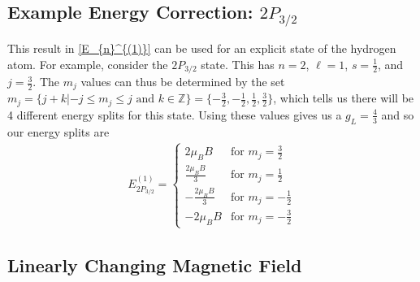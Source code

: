 \subsection{Example Energy Correction: $2P_{3/2}$}

This result in \ref{E_{n}^{(1)}} can be used for an explicit state of the hydrogen atom. For example, consider the $2P_{3/2}$ state. This has $n=2$, $\ell =1$, $s=\frac{1}{2}$, and $j=\frac{3}{2}$. The $m_j$ values can thus be determined by the set $m_j = \{j+k|-j \leq m_j \leq j \textrm{ and } k \in \mathbb{Z}\} = \{-\frac{3}{2},-\frac{1}{2}, \frac{1}{2}, \frac{3}{2} \}$, which tells us there will be 4 different energy splits for this state. Using these values gives us a $g_L=\frac{4}{3}$ and so our energy splits are
\begin{align}
	E_{2P_{3/2}}^{(1)} = \begin{cases}
		2\mu_BB & \textrm{for }m_j = \frac{3}{2}\\ 
		\frac{2\mu_BB}{3} & \textrm{for }m_j = \frac{1}{2} \\
		-\frac{2\mu_BB}{3}& \textrm{for }m_j = -\frac{1}{2} \\
		-2\mu_BB & \textrm{for }m_j = -\frac{3}{2}
	\end{cases}  \label{l=1 energies}
\end{align}




\subsection{Linearly Changing Magnetic Field}

